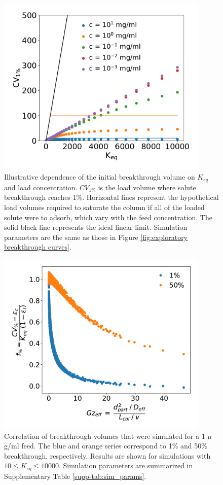 \documentclass[11pt,a4paper]{article}
\begin{document}
\begin{figure}[bp]
    \centering
    \includegraphics[width=0.9\textwidth]{figure_2}
    \caption{Illustrative dependence of the initial breakthrough volume on $K_{eq}$ and load concentration. $CV_{1\%}$ is the load volume where solute breakthrough reaches 1\%. Horizontal lines represent the hypothetical load volumes required to saturate the column if all of the loaded solute were to adsorb, which vary with the feed concentration. The solid black line represents the ideal linear limit. Simulation parameters are the same as those in Figure \ref{fig:exploratory breakthrough curves}.}
    \label{fig:initial breakthrough volumes vs Keq}
\end{figure}


\begin{figure}[bp]
    \centering
    \includegraphics[width=0.9\textwidth]{figure_3}
    \caption{Correlation of breakthrough volumes that were simulated for a 1 $\mu$g/ml feed. The blue and orange series correspond to 1\% and 50\% breakthrough, respectively. Results are shown for simulations with $10 \leq K_{eq} \leq 10000$. Simulation parameters are summarized in Supplementary Table \protect\ref{supp-tab:sim_params}.}
    \label{fig:correlation of breakthrough volumes}
\end{figure}
\end{document}
